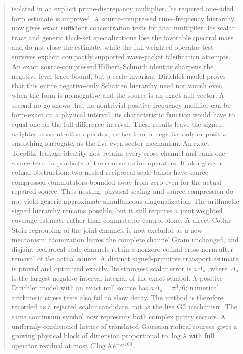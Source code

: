 \documentclass[11pt]{article}
\theoremstyle{remark}
\begin{document}
\begin{abstract}
isolated in an explicit prime-discrepancy multiplier. Its required
one-sided form estimate is unproved. A source-compressed
time--frequency hierarchy now gives exact sufficient concentration
tests for that multiplier. Its scalar trace and generic thick-set
specializations lose the favorable spectral mass and do not close the
estimate, while the full weighted operator test survives explicit
compactly supported wave-packet falsification attempts.
An exact source-compressed Hilbert--Schmidt identity sharpens the
negative-level trace bound, but a scale-invariant Dirichlet model proves
that this entire negative-only Schatten hierarchy need not vanish even
when the form is nonnegative and the source is an exact null vector.
A second no-go shows that no nontrivial positive frequency mollifier can
be form-exact on a physical interval: its characteristic function would
have to equal one on the full difference interval.  These results leave
the signed weighted concentration operator, rather than a negative-only
or positive-smoothing surrogate, as the live even-sector mechanism.
An exact Toeplitz--leakage identity now retains every cross-channel and
rank-one source term in products of the concentration operators.  It
also gives a cofinal obstruction: two nested reciprocal-scale bands have
source-compressed commutators bounded away from zero even for the actual
repaired source.  Thus nesting, physical scaling and source compression
do not yield generic approximate simultaneous diagonalization.  The
arithmetic signed hierarchy remains possible, but it still requires a
joint weighted coverage estimate rather than commutator control alone.
A direct Cotlar--Stein regrouping of the joint channels is now excluded
as a new mechanism: atomization leaves the complete channel Gram
unchanged, and disjoint reciprocal-scale channels retain a nonzero
cofinal cross norm after removal of the actual source.  A distinct
signed-primitive transport estimate is proved and optimized exactly.
Its strongest scalar error is $a\Delta_a$, where $\Delta_a$ is the
largest negative interval integral of the exact symbol.  A positive
Dirichlet model with an exact null source has $a\Delta_a=\pi^3/6$;
numerical arithmetic stress tests also fail to show decay.  The method
is therefore recorded as a rejected scalar candidate, not as the live
G2 mechanism.
The same continuum symbol now represents both complex parity sectors.
A uniformly conditioned lattice of translated Gaussian radical sources
gives a growing physical block of dimension proportional to $\log\lambda$
with full operator residual at most $C\log\lambda\,e^{-\lambda/100}$.

\end{abstract}
\end{document}

